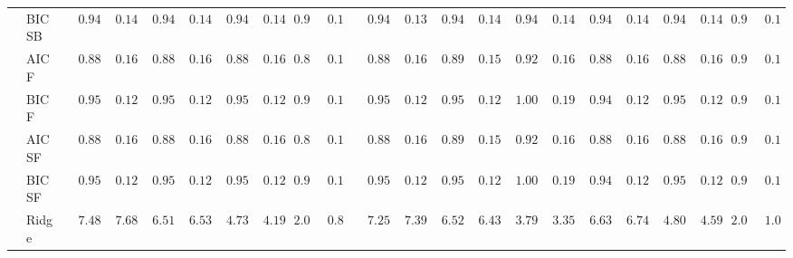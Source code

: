 \begin{tabular}{ll|ll|llllll|llllll|llllll}
 & BIC SB  & $\phantom{00}0.94$ & $\phantom{00}0.14$ & $\phantom{00}0.94$ & $\phantom{00}0.14$ & $\phantom{00}0.94$ & $\phantom{00}0.14$ & $\phantom{0}0.95$ & $\phantom{0}0.14$ & $\phantom{00}0.94$ & $\phantom{00}0.13$ & $\phantom{00}0.94$ & $\phantom{00}0.14$ & $\phantom{00}0.94$ & $\phantom{00}0.14$ & $\phantom{00}0.94$ & $\phantom{00}0.14$ & $\phantom{00}0.94$ & $\phantom{00}0.14$ & $\phantom{0}0.95$ & $\phantom{0}0.14$ \\
 & AIC F  & $\phantom{00}0.88$ & $\phantom{00}0.16$ & $\phantom{00}0.88$ & $\phantom{00}0.16$ & $\phantom{00}0.88$ & $\phantom{00}0.16$ & $\phantom{0}0.88$ & $\phantom{0}0.16$ & $\phantom{00}0.88$ & $\phantom{00}0.16$ & $\phantom{00}0.89$ & $\phantom{00}0.15$ & $\phantom{00}0.92$ & $\phantom{00}0.16$ & $\phantom{00}0.88$ & $\phantom{00}0.16$ & $\phantom{00}0.88$ & $\phantom{00}0.16$ & $\phantom{0}0.91$ & $\phantom{0}0.15$ \\
 & BIC F  & $\phantom{00}0.95$ & $\phantom{00}0.12$ & $\phantom{00}0.95$ & $\phantom{00}0.12$ & $\phantom{00}0.95$ & $\phantom{00}0.12$ & $\phantom{0}0.95$ & $\phantom{0}0.12$ & $\phantom{00}0.95$ & $\phantom{00}0.12$ & $\phantom{00}0.95$ & $\phantom{00}0.12$ & $\phantom{00}1.00$ & $\phantom{00}0.19$ & $\phantom{00}0.94$ & $\phantom{00}0.12$ & $\phantom{00}0.95$ & $\phantom{00}0.12$ & $\phantom{0}0.97$ & $\phantom{0}0.15$ \\
 & AIC SF  & $\phantom{00}0.88$ & $\phantom{00}0.16$ & $\phantom{00}0.88$ & $\phantom{00}0.16$ & $\phantom{00}0.88$ & $\phantom{00}0.16$ & $\phantom{0}0.88$ & $\phantom{0}0.16$ & $\phantom{00}0.88$ & $\phantom{00}0.16$ & $\phantom{00}0.89$ & $\phantom{00}0.15$ & $\phantom{00}0.92$ & $\phantom{00}0.16$ & $\phantom{00}0.88$ & $\phantom{00}0.16$ & $\phantom{00}0.88$ & $\phantom{00}0.16$ & $\phantom{0}0.91$ & $\phantom{0}0.15$ \\
 & BIC SF  & $\phantom{00}0.95$ & $\phantom{00}0.12$ & $\phantom{00}0.95$ & $\phantom{00}0.12$ & $\phantom{00}0.95$ & $\phantom{00}0.12$ & $\phantom{0}0.95$ & $\phantom{0}0.12$ & $\phantom{00}0.95$ & $\phantom{00}0.12$ & $\phantom{00}0.95$ & $\phantom{00}0.12$ & $\phantom{00}1.00$ & $\phantom{00}0.19$ & $\phantom{00}0.94$ & $\phantom{00}0.12$ & $\phantom{00}0.95$ & $\phantom{00}0.12$ & $\phantom{0}0.97$ & $\phantom{0}0.15$ \\
 & Ridge  & $\phantom{00}7.48$ & $\phantom{00}7.68$ & $\phantom{00}6.51$ & $\phantom{00}6.53$ & $\phantom{00}4.73$ & $\phantom{00}4.19$ & $\phantom{0}2.09$ & $\phantom{0}0.84$ & $\phantom{00}7.25$ & $\phantom{00}7.39$ & $\phantom{00}6.52$ & $\phantom{00}6.43$ & $\phantom{00}3.79$ & $\phantom{00}3.35$ & $\phantom{00}6.63$ & $\phantom{00}6.74$ & $\phantom{00}4.80$ & $\phantom{00}4.59$ & $\phantom{0}2.08$ & $\phantom{0}1.05$ \\

\end{tabular}
